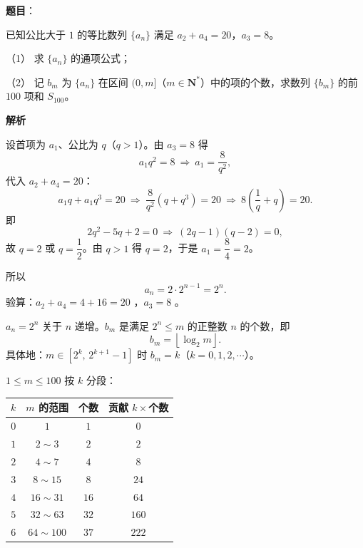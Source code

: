 \begin{answer}

\textbf{题目}：

已知公比大于 $1$ 的等比数列 $\{a_n\}$ 满足 $a_2+a_4=20$，$a_3=8$。

（1） 求 $\{a_n\}$ 的通项公式；

（2） 记 $b_m$ 为 $\{a_n\}$ 在区间 $(0,m]$（$m\in\mathbf N^*$）中的项的个数，求数列 $\{b_m\}$ 的前 $100$ 项和 $S_{100}$。

\textbf{解析}


设首项为 $a_1$、公比为 $q$（$q>1$）。由 $a_3=8$ 得
\nopagebreak[4]
\[a_1q^2=8\ \Longrightarrow\ a_1=\frac8{q^2},\]
代入 $a_2+a_4=20$：
\nopagebreak[4]
\[a_1q+a_1q^3=20\ \Longrightarrow\ \frac8{q^2}\left(q+q^3\right)=20\ \Longrightarrow\ 8\left(\frac1q+q\right)=20 .\]
即
\nopagebreak[4]
\[2q^2-5q+2=0\ \Longrightarrow\ (2q-1)(q-2)=0,\]
故 $q=2$ 或 $q=\dfrac12$。由 $q>1$ 得 $q=2$，于是 $a_1=\dfrac8{4}=2$。

所以
\nopagebreak[4]
\[a_n=2\cdot2^{n-1}=2^n .\]
验算：$a_2+a_4=4+16=20$ ，$a_3=8$ 。


$a_n=2^n$ 关于 $n$ 递增。$b_m$ 是满足 $2^n\leqslant m$ 的正整数 $n$ 的个数，即
\nopagebreak[4]
\[b_m=\left\lfloor\log_2m\right\rfloor .\]
具体地：$m\in\left[2^k,\,2^{k+1}-1\right]$ 时 $b_m=k$（$k=0,1,2,\cdots$）。

$1\leqslant m\leqslant100$ 按 $k$ 分段：

\begin{center}
\begin{tabular}{cccc}
\toprule
$k$ & $m$ 的范围 & 个数 & 贡献 $k\times$个数 \\
\midrule
$0$ & $1$ & $1$ & $0$ \\
$1$ & $2\sim3$ & $2$ & $2$ \\
$2$ & $4\sim7$ & $4$ & $8$ \\
$3$ & $8\sim15$ & $8$ & $24$ \\
$4$ & $16\sim31$ & $16$ & $64$ \\
$5$ & $32\sim63$ & $32$ & $160$ \\
$6$ & $64\sim100$ & $37$ & $222$ \\
\bottomrule
\end{tabular}
\end{center}


\end{answer}

